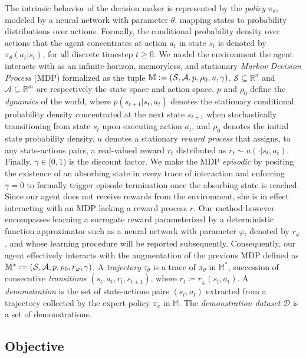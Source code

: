The intrinsic behavior of the decision maker is represented by the \emph{policy} $\pi_\theta$,
modeled by a neural network with parameter $\theta$,
mapping states to probability distributions over actions.
Formally, the conditional probability density over actions that the agent
concentrates at action $a_t$ in state $s_t$ is denoted by $\pi_\theta(a_t | s_t)$,
for all discrete timestep $t \geq 0$.
We model the environment the agent interacts with as an infinite-horizon, memoryless, and stationary
\emph{Markov Decision Process} (MDP) \cite{Puterman1994-pf}
formalized as the tuple
$\mathbb{M} \vcentcolon= (\mathcal{S}, \mathcal{A}, p, \rho_0, u, \gamma)$.
$\mathcal{S} \subseteq \mathbb{R}^n$ and $\mathcal{A} \subseteq \mathbb{R}^m$
are respectively the state space and action space.
$p$ and $\rho_0$ define the \emph{dynamics} of the world,
where $p(s_{t+1} | s_t, a_t)$ denotes the stationary conditional probability density
concentrated at the next state $s_{t+1}$
when stochastically transitioning from state $s_t$ upon executing action $a_t$,
and $\rho_0$ denotes the initial state probability density.
$u$ denotes a stationary \emph{reward process}
that assigns, to any state-actions pairs,
a real-valued reward $r_t$ distributed as $r_t \sim u(\cdot | s_t, a_t)$.
Finally, $\gamma \in [0, 1)$ is the discount factor.
We make the MDP \emph{episodic}
by positing the existence of an absorbing state in every trace of interaction and
enforcing $\gamma = 0$ to formally trigger episode termination
once the absorbing state is reached.
Since our agent does not receive rewards from the environment,
she is in effect interacting with an MDP lacking a reward process $r$.
Our method however encompasses learning a surrogate reward parameterized
by a deterministic function approximator
such as a neural network with parameter $\varphi$, denoted by $r_\varphi$, and
whose learning procedure will be reported subsequently.
Consequently, our agent effectively interacts with the augmentation of the previous MDP defined as
$\mathbb{M}^* \vcentcolon= (\mathcal{S}, \mathcal{A}, p, \rho_0, r_\varphi, \gamma)$.
A \emph{trajectory} $\tau_\theta$ is a trace of $\pi_\theta$ in $\mathbb{M}^*$, succession of
consecutive \emph{transitions} $(s_t, a_t, r_t, s_{t+1})$,
where $r_t \coloneqq r_\varphi(s_t, a_t)$.
A \emph{demonstration} is the set of state-actions pairs $(s_t, a_t)$
extracted from a trajectory collected by the expert policy $\pi_e$
in $\mathbb{M}$.
The \emph{demonstration dataset} $\mathcal{D}$ is a set of demonstrations.

\subsection*{Objective}

